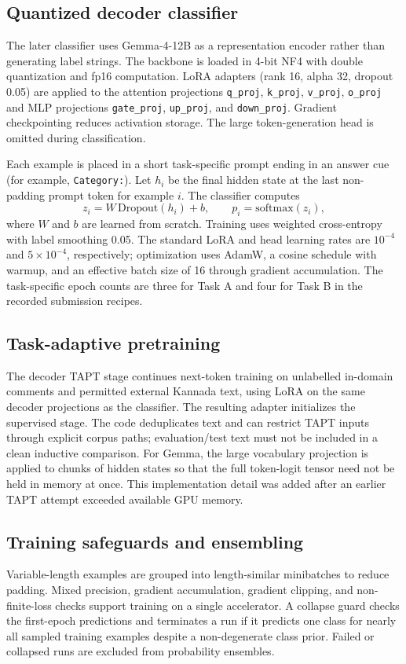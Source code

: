 \documentclass[10pt]{article}
\newcommand{\taska}{Task A}
\newcommand{\taskb}{Task B}
\begin{document}
\subsection{Quantized decoder classifier}
The later classifier uses Gemma-4-12B as a representation encoder rather than
generating label strings. The backbone is loaded in 4-bit NF4 with double
quantization and fp16 computation. LoRA adapters (rank 16, alpha 32, dropout
0.05) are applied to the attention projections
\texttt{q\_proj}, \texttt{k\_proj}, \texttt{v\_proj}, \texttt{o\_proj} and MLP
projections \texttt{gate\_proj}, \texttt{up\_proj}, and \texttt{down\_proj}.
Gradient checkpointing reduces activation storage. The large token-generation
head is omitted during classification.

Each example is placed in a short task-specific prompt ending in an answer cue
(for example, \texttt{Category:}). Let $h_i$ be the final hidden state at the
last non-padding prompt token for example $i$. The classifier computes
\[
  z_i = W\,\mathrm{Dropout}(h_i) + b,
  \qquad p_i = \mathrm{softmax}(z_i),
\]
where $W$ and $b$ are learned from scratch. Training uses weighted cross-entropy
with label smoothing 0.05. The standard LoRA and head learning rates are
$10^{-4}$ and $5\times10^{-4}$, respectively; optimization uses AdamW, a cosine
schedule with warmup, and an effective batch size of 16 through gradient
accumulation. The task-specific epoch counts are three for \taska{} and four
for \taskb{} in the recorded submission recipes.

\subsection{Task-adaptive pretraining}
The decoder TAPT stage continues next-token training on unlabelled in-domain
comments and permitted external Kannada text, using LoRA on the same decoder
projections as the classifier. The resulting adapter initializes the supervised
stage. The code deduplicates text and can restrict TAPT inputs through explicit
corpus paths; evaluation/test text must not be included in a clean inductive
comparison. For Gemma, the large vocabulary projection is applied to chunks of
hidden states so that the full token-logit tensor need not be held in memory at
once. This implementation detail was added after an earlier TAPT attempt
exceeded available GPU memory.

\subsection{Training safeguards and ensembling}
Variable-length examples are grouped into length-similar minibatches to reduce
padding. Mixed precision, gradient accumulation, gradient clipping, and
non-finite-loss checks support training on a single accelerator. A collapse
guard checks the first-epoch predictions and terminates a run if it predicts one
class for nearly all sampled training examples despite a non-degenerate class
prior. Failed or collapsed runs are excluded from probability ensembles.
\end{document}

